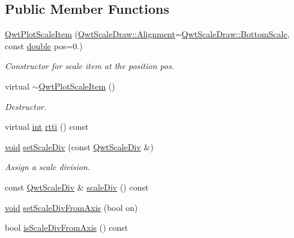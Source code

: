 \subsection*{Public Member Functions}
\begin{DoxyCompactItemize}
\item 
\hyperlink{class_qwt_plot_scale_item_a9d093fc9de7d423435f455c110d4605d}{Qwt\-Plot\-Scale\-Item} (\hyperlink{class_qwt_scale_draw_acd7ceeeac592ef08530788580b461c66}{Qwt\-Scale\-Draw\-::\-Alignment}=\hyperlink{class_qwt_scale_draw_acd7ceeeac592ef08530788580b461c66a0e16389e135da75f06117d1ee3ef765f}{Qwt\-Scale\-Draw\-::\-Bottom\-Scale}, const \hyperlink{_super_l_u_support_8h_a8956b2b9f49bf918deed98379d159ca7}{double} pos=0.)
\begin{DoxyCompactList}\small\item\em Constructor for scale item at the position pos. \end{DoxyCompactList}\item 
virtual \hyperlink{class_qwt_plot_scale_item_a8f246e1e73704c1c40ae1294269b65fa}{$\sim$\-Qwt\-Plot\-Scale\-Item} ()
\begin{DoxyCompactList}\small\item\em Destructor. \end{DoxyCompactList}\item 
virtual \hyperlink{ioapi_8h_a787fa3cf048117ba7123753c1e74fcd6}{int} \hyperlink{class_qwt_plot_scale_item_a72d7c46ade62f45f3dffa93931900d74}{rtti} () const 
\item 
\hyperlink{group___u_a_v_objects_plugin_ga444cf2ff3f0ecbe028adce838d373f5c}{void} \hyperlink{class_qwt_plot_scale_item_a99032adf91892f73d06a4810cd78d26b}{set\-Scale\-Div} (const \hyperlink{class_qwt_scale_div}{Qwt\-Scale\-Div} \&)
\begin{DoxyCompactList}\small\item\em Assign a scale division. \end{DoxyCompactList}\item 
const \hyperlink{class_qwt_scale_div}{Qwt\-Scale\-Div} \& \hyperlink{class_qwt_plot_scale_item_a06695f68519b2cc8660441d12d84ab13}{scale\-Div} () const 
\item 
\hyperlink{group___u_a_v_objects_plugin_ga444cf2ff3f0ecbe028adce838d373f5c}{void} \hyperlink{class_qwt_plot_scale_item_a0b4660ad3d3fcf1f1de711b075b073c6}{set\-Scale\-Div\-From\-Axis} (bool on)
\item 
bool \hyperlink{class_qwt_plot_scale_item_a05c89366c36fb0417e76b1a93d1ef93c}{is\-Scale\-Div\-From\-Axis} () const 

\end{DoxyCompactItemize}
